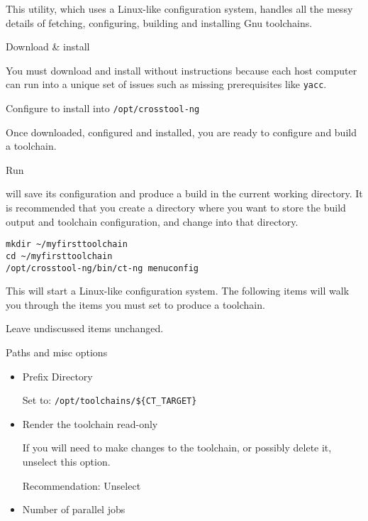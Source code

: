 This utility, which uses a Linux-like configuration system, handles
all the messy details of fetching, configuring, building and
installing Gnu toolchains.

\begin{description}
\item Download \& install \ctng

  You must download and install \ctng without instructions because
  each host computer can run into a unique set of issues such as
  missing prerequisites like \texttt{yacc}.

  Configure \ctng to install into \texttt{/opt/crosstool-ng}

  Once downloaded, configured and installed, you are ready to
  configure and build a toolchain.

  \item Run \ctng

    \ctng will save its configuration and produce a build in the
    current working directory.  It is recommended that you create a
    directory where you want to store the build output and toolchain
    configuration, and change into that directory.

\begin{verbatim}
mkdir ~/myfirsttoolchain
cd ~/myfirsttoolchain
/opt/crosstool-ng/bin/ct-ng menuconfig
\end{verbatim}

    This will start a Linux-like configuration system.  The following
    items will walk you through the items you must set to produce a
    toolchain.

    Leave undiscussed items unchanged.

    \begin{description}

    \item Paths and misc options

      \begin{itemize}
      \item{Prefix Directory}

        Set to: \texttt{/opt/toolchains/\$\{CT\_TARGET\}}

      \item{Render the toolchain read-only}

        If you will need to make changes to the toolchain, or possibly
        delete it, unselect this option.

        Recommendation: Unselect

      \item{Number of parallel jobs}


\end{itemize}
\end{description}
\end{description}
